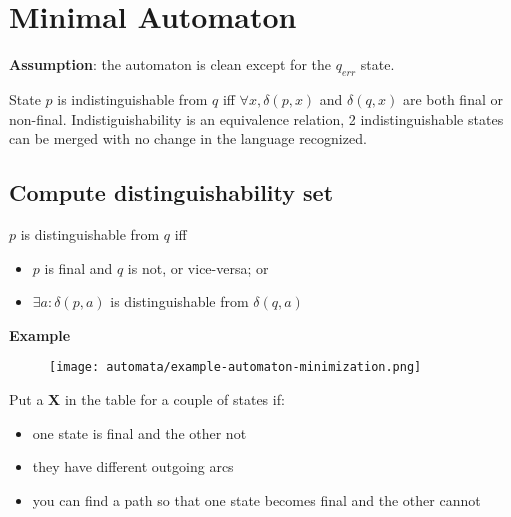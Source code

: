 \section{Minimal Automaton}

\textbf{Assumption}: the automaton is clean except for the $q_{err}$ state.

State $p$ is indistinguishable from $q$ iff $\forall x, \delta(p,x)$ and $\delta(q, x)$ are both final or non-final. Indistiguishability is an equivalence relation, 2 indistinguishable states can be merged with no change in the language recognized.

\subsection{Compute distinguishability set}
$p$ is distinguishable from $q$ iff
\begin{itemize}
    \item $p$ is final and $q$ is not, or vice-versa; or
    \item $\exists a: \delta(p, a)$ is distinguishable from $\delta(q, a)$
\end{itemize}

\textbf{Example}
\begin{figure}[H]
    \centering
    \texttt{[image: automata/example-automaton-minimization.png]}
\end{figure}
Put a \textbf{X} in the table for a couple of states if:
\begin{itemize}
  \item one state is final and the other not
  \item they have different outgoing arcs
  \item you can find a path so that one state becomes final and the other cannot
\end{itemize}

